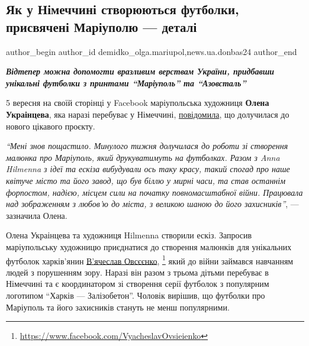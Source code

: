  
 
 
 
 
 
\subsection{Як у Німеччині створюються футболки, присвячені Маріуполю — деталі}
\label{sec:06_09_2022.stz.news.ua.donbas24.2.futbolki_nimecchyna_mrpl}
 
\ifcmt
 author_begin
   author_id demidko_olga.mariupol,news.ua.donbas24
 author_end
\fi


\begin{center}
  \em\color{blue}\bfseries\Large
Відтепер можна допомогти вразливим верствам України, придбавши унікальні
футболки з принтами \enquote{Маріуполь} та \enquote{Азовсталь}
\end{center}

5 вересня на своїй сторінці у Facebook маріупольська художниця \textbf{Олена
Украінцева}, яка наразі перебуває у Німеччині, \href{https://www.facebook.com/profile.php?id=100002254840110}{повідомила}, що долучилася до
нового цікавого проєкту.

\begin{leftbar}
\emph{\enquote{Мені знов пощастило. Минулого тижня долучилася до роботи зі створення
малюнка про Маріуполь, який друкуватимуть на футболках. Разом з Anna Hilmenna з
ідеї та ескіза вибудували ось таку красу, такий спогад про наше квітуче місто
та його завод, що був біллю у мирні часи, та став останнім форпостом, надією,
місцем сили на початку повномасштабної війни. Працювала над зображенням з
любов'ю до міста, з великою шаною до його захисників}}, — зазначила Олена.
\end{leftbar}

Олена Украінцева та художниця Hilmenna створили ескіз. Запросив маріупольську
художницю приєднатися до створення малюнків для унікальних футболок харків'янин
\href{https://www.facebook.com/VyacheslavOvsieienko}{В'ячеслав Овсєєнко},%
\footnote{\url{https://www.facebook.com/VyacheslavOvsieienko}}
який до війни займався навчанням людей з порушенням зору.
Наразі він разом з трьома дітьми перебуває в Німеччині та є координатором зі
створення серії футболок з популярним логотипом \enquote{Харків — Залізобетон}. Чоловік
вирішив, що футболки про Маріуполь та його захисників стануть не менш
популярними.

